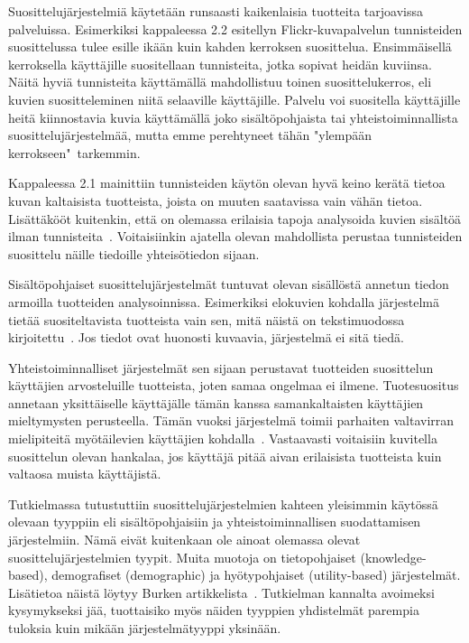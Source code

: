 \documentclass[12pt,finnish]{tktltiki2}
\theoremstyle{definition}
\theoremstyle{remark}
\begin{document}
Suosittelujärjestelmiä käytetään runsaasti kaikenlaisia tuotteita tarjoavissa palveluissa. Esimerkiksi kappaleessa 2.2 esitellyn Flickr-kuvapalvelun tunnisteiden suosittelussa tulee esille ikään kuin kahden kerroksen suosittelua. Ensimmäisellä kerroksella käyttäjille suositellaan tunnisteita, jotka sopivat heidän kuviinsa. Näitä hyviä tunnisteita käyttämällä mahdollistuu toinen suosittelukerros, eli kuvien suositteleminen niitä selaaville käyttäjille. Palvelu voi suositella käyttäjille heitä kiinnostavia kuvia käyttämällä joko sisältöpohjaista tai yhteistoiminnallista suosittelujärjestelmää, mutta emme perehtyneet tähän "ylempään kerrokseen"\ tarkemmin.

Kappaleessa 2.1 mainittiin tunnisteiden käytön olevan hyvä keino kerätä tietoa kuvan kaltaisista tuotteista, joista on muuten saatavissa vain vähän tietoa. Lisättäkööt kuitenkin, että on olemassa erilaisia tapoja analysoida kuvien sisältöä ilman tunnisteita~\cite{Sigurbjornsson:2008:FTR:1367497.1367542}. Voitaisiinkin ajatella olevan mahdollista perustaa tunnisteiden suosittelu näille tiedoille yhteisötiedon sijaan.

Sisältöpohjaiset suosittelujärjestelmät tuntuvat olevan sisällöstä annetun tiedon armoilla tuotteiden analysoinnissa. Esimerkiksi elokuvien kohdalla järjestelmä tietää suositeltavista tuotteista vain sen, mitä näistä on tekstimuodossa kirjoitettu~\cite{Ullman}. Jos tiedot ovat huonosti kuvaavia, järjestelmä ei sitä tiedä. 

Yhteistoiminnalliset järjestelmät sen sijaan perustavat tuotteiden suosittelun käyttäjien arvosteluille tuotteista, joten samaa ongelmaa ei ilmene. Tuotesuositus annetaan yksittäiselle käyttäjälle tämän kanssa samankaltaisten käyttäjien mieltymysten perusteella. Tämän vuoksi järjestelmä toimii parhaiten valtavirran mielipiteitä myötäilevien käyttäjien kohdalla~\cite{Burke:2002:HRS:586321.586352}. Vastaavasti voitaisiin kuvitella suosittelun olevan hankalaa, jos käyttäjä pitää aivan erilaisista tuotteista kuin valtaosa muista käyttäjistä.


Tutkielmassa tutustuttiin suosittelujärjestelmien kahteen yleisimmin käytössä olevaan tyyppiin eli sisältöpohjaisiin ja yhteistoiminnallisen suodattamisen järjestelmiin. Nämä eivät kuitenkaan ole ainoat olemassa olevat suosittelujärjestelmien tyypit. Muita muotoja on tietopohjaiset (knowledge-based), demografiset (demographic) ja hyötypohjaiset (utility-based) järjestelmät. Lisätietoa näistä löytyy Burken artikkelista~\cite{Burke:2002:HRS:586321.586352}. Tutkielman kannalta avoimeksi kysymykseksi jää, tuottaisiko myös näiden tyyppien yhdistelmät parempia tuloksia kuin mikään järjestelmätyyppi yksinään.
\end{document}
